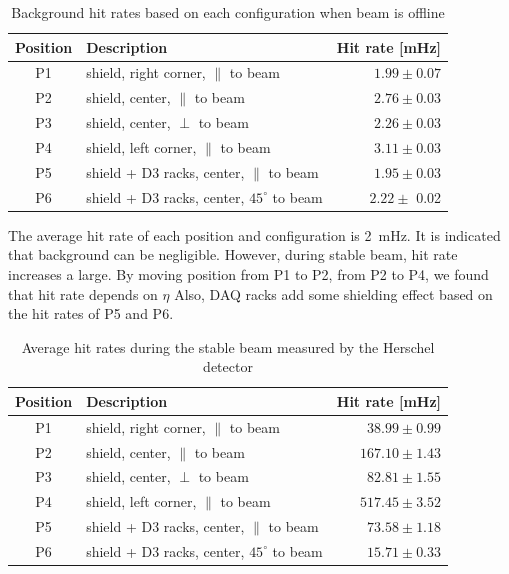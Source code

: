 \begin{table}
\begin{center}
\begin{tabular}{c|l|r}
  Position & \hspace{2cm}Description & Hit rate [mHz] \\
  \hline \hline
   P1 & shield, right corner, $\parallel$ to beam& $1.99\pm0.07$ \\ \hline
   P2 & shield, center, $\parallel$ to beam&  $2.76\pm 0.03$ \\ \hline
   P3 & shield, center, $\perp$ to beam& $ 2.26\pm 0.03$ \\ \hline
   P4 & shield, left corner, $\parallel$ to beam& $ 3.11\pm 0.03$ \\ \hline
   P5 & shield + D3 racks, center, $\parallel$ to beam& $ 1.95\pm 0.03$ \\ \hline
   P6 & shield + D3 racks, center, $45^\circ$ to beam& $ 2.22\pm $ 0.02\\ \hline
\end{tabular}
\caption{
    Background hit rates based on each configuration when beam is offline 
}
\end{center}
\end{table}

The average hit rate of each position and configuration is 2~mHz. 
It is indicated that background can be negligible. 
However, during stable beam, hit rate increases a large.
By moving position from P1 to P2, from P2 to P4, we found that hit rate depends on $\eta$
Also, DAQ racks add some shielding effect based on the hit rates of P5 and P6.

\begin{table}
\begin{center}
\begin{tabular}{c|l|r}
  Position & \hspace{0.9cm}Description & Hit rate [mHz] \\
  \hline \hline
   P1 & shield, right corner, $\parallel$ to beam & $ 38.99 \pm 0.99 $\\ \hline
   P2 & shield, center, $\parallel$ to beam& $ 167.10 \pm 1.43$ \\ \hline
   P3 & shield, center, $\perp$ to beam& $ 82.81 \pm 1.55 $ \\ \hline
   P4 & shield, left corner, $\parallel$ to beam& $ 517.45 \pm 3.52 $ \\ \hline
   P5 & shield + D3 racks, center, $\parallel$ to beam& $ 73.58 \pm 1.18 $ \\ \hline
   P6 & shield + D3 racks, center, $45^\circ$ to beam& $ 15.71 \pm 0.33 $ \\ \hline
\end{tabular}
\caption{
    Average hit rates during the stable beam measured by the Herschel detector
}
\end{center}
\end{table}

